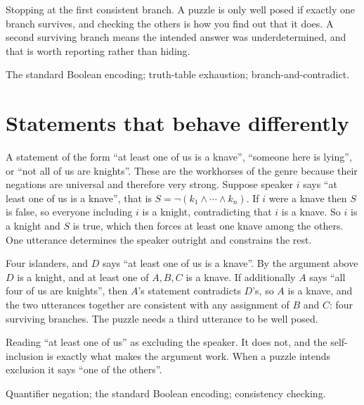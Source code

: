 \begin{trap}
Stopping at the first consistent branch. A puzzle is only well posed if exactly one branch survives, and checking the others is how you find out that it does. A second surviving branch means the intended answer was underdetermined, and that is worth reporting rather than hiding.
\end{trap}

\begin{seealsob}The standard Boolean encoding; truth-table exhaustion; branch-and-contradict.\end{seealsob}

\section{Statements that behave differently}

\cue A statement of the form ``at least one of us is a knave'', ``someone here is lying'', or ``not all of us are knights''.
\method These are the workhorses of the genre because their negations are universal and therefore very strong. Suppose speaker $i$ says ``at least one of us is a knave'', that is $S=\lnot(k_{1}\wedge\cdots\wedge k_{n})$. If $i$ were a knave then $S$ is false, so everyone including $i$ is a knight, contradicting that $i$ is a knave. So $i$ is a knight and $S$ is true, which then forces at least one knave among the others. One utterance determines the speaker outright and constrains the rest.

\begin{worked}
Four islanders, and $D$ says ``at least one of us is a knave''. By the argument above $D$ is a knight, and at least one of $A,B,C$ is a knave. If additionally $A$ says ``all four of us are knights'', then $A$'s statement contradicts $D$'s, so $A$ is a knave, and the two utterances together are consistent with any assignment of $B$ and $C$: four surviving branches. The puzzle needs a third utterance to be well posed.
\end{worked}

\begin{trap}
Reading ``at least one of us'' as excluding the speaker. It does not, and the self-inclusion is exactly what makes the argument work. When a puzzle intends exclusion it says ``one of the others''.
\end{trap}

\begin{seealsob}Quantifier negation; the standard Boolean encoding; consistency checking.\end{seealsob}

